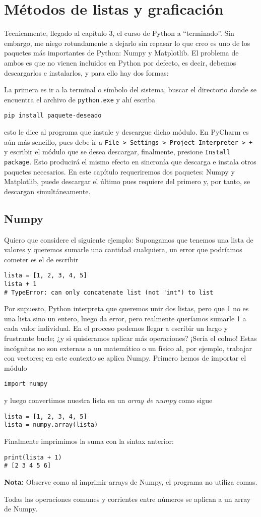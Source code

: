 \documentclass[11pt,twoside]{report}
\begin{document}
\chapter{Métodos de listas y graficación}
Tecnicamente, llegado al capítulo 3, el curso de Python a ``terminado''. Sin embargo, me niego rotundamente a dejarlo sin repasar lo que creo es uno de los paquetes más importantes de Python: Numpy y Matplotlib. El problema de ambos es que no vienen incluidos en Python por defecto, es decir, debemos descargarlos e instalarlos, y para ello hay dos formas:

La primera es ir a la terminal o símbolo del sistema, buscar el directorio donde se encuentra el archivo de \texttt{python.exe} y ahí escriba
\begin{lstlisting}
pip install paquete-deseado
\end{lstlisting}
esto le dice al programa que instale y descargue dicho módulo. En PyCharm es aún más sencillo, pues debe ir a \texttt{File > Settings > Project Interpreter > +} y escribir el módulo que se desea descargar, finalmente, presione \texttt{Install package}. Esto producirá el mismo efecto en sincronía que descarga e instala otros paquetes necesarios. En este capítulo requeriremos dos paquetes: Numpy y Matplotlib, puede descargar el último pues requiere del primero y, por tanto, se descargan simultáneamente.

\section{Numpy}
Quiero que considere el siguiente ejemplo: Supongamos que tenemos una lista de valores y queremos sumarle una cantidad cualquiera, un error que podríamos cometer es el de escribir
\begin{lstlisting}
lista = [1, 2, 3, 4, 5]
lista + 1
# TypeError: can only concatenate list (not "int") to list
\end{lstlisting}
Por supuesto, Python interpreta que queremos unir dos listas, pero que 1 no es una lista sino un entero, luego da error, pero realmente queríamos sumarle 1 a cada valor individual. En el proceso podemos llegar a escribir un largo y frustrante bucle; ¿y si quisieramos aplicar más operaciones? ¡Sería el colmo! Estas incógnitas no son externas a un matemático o un físico al, por ejemplo, trabajar con vectores; en este contexto se aplica Numpy. Primero hemos de importar el módulo
\begin{lstlisting}
import numpy
\end{lstlisting}
y luego convertimos nuestra lista en un \textit{array de numpy} como sigue
\begin{lstlisting}
lista = [1, 2, 3, 4, 5]
lista = numpy.array(lista)
\end{lstlisting}
Finalmente imprimimos la suma con la sintax anterior:
\begin{lstlisting}
print(lista + 1)
# [2 3 4 5 6]
\end{lstlisting}
\textbf{Nota:} Observe como al imprimir arrays de Numpy, el programa no utiliza comas.

Todas las operaciones comunes y corrientes entre números se aplican a un array de Numpy.
\end{document}
